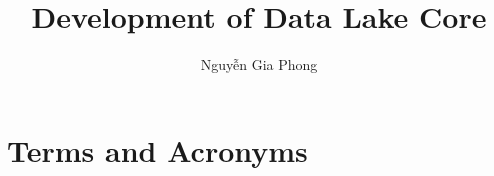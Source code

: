 \usepackage[vietnamese,english]{babel}
\usepackage{lmodern}
\usepackage{booktabs}
\usepackage{graphicx}
\usepackage{titling}
\usepackage{ccicons}
\usepackage[Bjornstrup]{fncychap}
\usepackage{hyperref}
\usepackage{enumitem}
\usepackage{siunitx}
\usepackage{listings}
\usepackage[numbib]{tocbibind}
\usepackage[acronym,section,toc]{glossaries}


\newcommand{\arxiv}[1]{\href{https://arxiv.org/abs/#1}{arXiv:#1}}
\newcommand{\doi}[1]{\href{https://doi.org/#1}{doi:#1}}
\newcommand{\rfc}[1]{\doi{10.17487/rfc#1}}

\author{Nguyễn Gia Phong}
\title{Development of Data Lake Core}





\frontmatter
\setcounter{page}{1}
\pagestyle{plain}
\tableofcontents


\mainmatter
\pagestyle{headings}
\setcounter{secnumdepth}{3}
\lstset{basicstyle=\ttfamily}





\appendix


\chapter{Terms and Acronyms}\printglossaries

